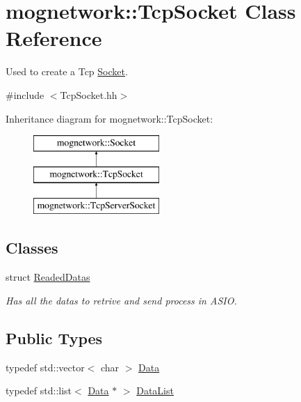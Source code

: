 \hypertarget{classmognetwork_1_1_tcp_socket}{\section{mognetwork\-:\-:Tcp\-Socket Class Reference}
\label{classmognetwork_1_1_tcp_socket}
}


Used to create a Tcp \hyperlink{classmognetwork_1_1_socket}{Socket}.  




{\ttfamily \#include $<$Tcp\-Socket.\-hh$>$}

Inheritance diagram for mognetwork\-:\-:Tcp\-Socket\-:\begin{figure}[H]
\begin{center}
\leavevmode
\includegraphics[height=3.000000cm]{classmognetwork_1_1_tcp_socket}
\end{center}
\end{figure}
\subsection*{Classes}
\begin{DoxyCompactItemize}
\item 
struct \hyperlink{structmognetwork_1_1_tcp_socket_1_1_readed_datas}{Readed\-Datas}
\begin{DoxyCompactList}\small\item\em Has all the datas to retrive and send process in A\-S\-I\-O. \end{DoxyCompactList}\end{DoxyCompactItemize}
\subsection*{Public Types}
\begin{DoxyCompactItemize}
\item 
typedef std\-::vector$<$ char $>$ \hyperlink{classmognetwork_1_1_tcp_socket_aa80d910649a16cedb6c98297e5893ed1}{Data}
\item 
typedef std\-::list$<$ \hyperlink{classmognetwork_1_1_tcp_socket_aa80d910649a16cedb6c98297e5893ed1}{Data} $\ast$ $>$ \hyperlink{classmognetwork_1_1_tcp_socket_acd1726904d918e617c84eaf198196506}{Data\-List}
\end{DoxyCompactItemize}
